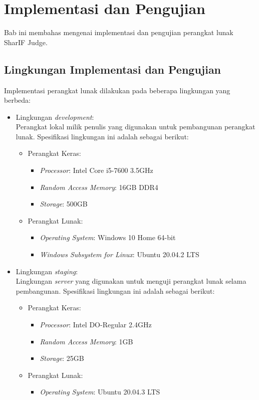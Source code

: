 \chapter{Implementasi dan Pengujian}
\label{chap:implementasidanpengujian}

Bab ini membahas mengenai implementasi dan pengujian perangkat lunak SharIF Judge.

\section{Lingkungan Implementasi dan Pengujian}
\label{sec:5:lingkungan}

Implementasi perangkat lunak dilakukan pada beberapa lingkungan yang berbeda:

\begin{itemize}
    \item Lingkungan \textit{development}: \\ Perangkat lokal milik penulis yang digunakan untuk pembangunan perangkat lunak. Spesifikasi lingkungan ini adalah sebagai berikut:
    \begin{itemize}
        \item Perangkat Keras:
        \begin{itemize}
            \item \textit{Processor}: Intel Core i5-7600 3.5GHz
            \item \textit{Random Access Memory}: 16GB DDR4
            \item \textit{Storage}: 500GB
        \end{itemize}
        \item Perangkat Lunak:
        \begin{itemize}
            \item \textit{Operating System}: Windows 10 Home 64-bit
            \item \textit{Windows Subsystem for Linux}: Ubuntu 20.04.2 LTS
        \end{itemize}
    \end{itemize}
    
    \item Lingkungan \textit{staging}: \\ Lingkungan \textit{server} yang digunakan untuk menguji perangkat lunak selama pembangunan. Spesifikasi lingkungan ini adalah sebagai berikut:
    \begin{itemize}
    \item Perangkat Keras:
        \begin{itemize}
            \item \textit{Processor}: Intel DO-Regular 2.4GHz
            \item \textit{Random Access Memory}: 1GB
            \item \textit{Storage}: 25GB
        \end{itemize}
            \item Perangkat Lunak:
        \begin{itemize}
            \item \textit{Operating System}: Ubuntu 20.04.3 LTS
        \end{itemize}
    \end{itemize}
    

\end{itemize}
